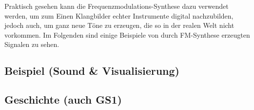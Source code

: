 Praktisch gesehen kann die Frequenzmodulations-Synthese dazu verwendet werden, um zum Einen Klangbilder echter Instrumente digital nachzubilden, jedoch auch, um ganz neue Töne zu erzeugen, die so in der realen Welt nicht vorkommen. Im Folgenden sind einige Beispiele von durch FM-Synthese erzeugten Signalen zu sehen.

\subsection{Beispiel (Sound \& Visualisierung)}
\subsection{Geschichte (auch GS1)}